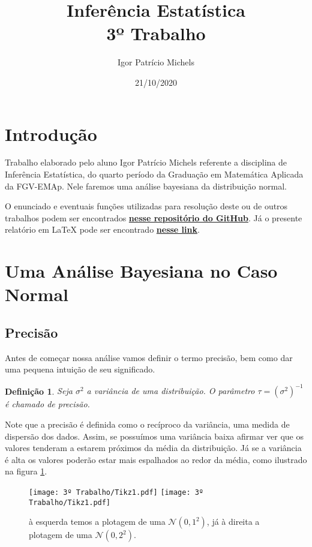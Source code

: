 \documentclass{article}
\title{Inferência Estatística \\ 3º Trabalho}
\author{Igor Patrício Michels}
\date{21/10/2020}
\newtheorem{definition}{Definição}
\begin{document}
\maketitle

\section*{Introdução}

Trabalho elaborado pelo aluno Igor Patrício Michels referente a disciplina de Inferência Estatística, do quarto período da Graduação em Matemática Aplicada da FGV-EMAp. Nele faremos uma análise bayesiana da distribuição normal.

O enunciado e eventuais funções utilizadas para resolução deste ou de outros trabalhos podem ser encontrados \href{https://github.com/IgorMichels/Statistical_Inference}{\textbf{nesse repositório do GitHub}}. Já o presente relatório em \LaTeX{} pode ser encontrado \href{https://www.overleaf.com/read/sdfnbcnthrms}{\textbf{nesse link}}.

\section*{Uma Análise Bayesiana no Caso Normal}

\subsection*{Precisão}

Antes de começar nossa análise vamos definir o termo precisão, bem como dar uma pequena intuição de seu significado.

\begin{definition}
    Seja $\sigma^2$ a variância de uma distribuição. O parâmetro $\tau = \left(\sigma^2\right)^{-1}$ é chamado de precisão.
\end{definition}

Note que a precisão é definida como o recíproco da variância, uma medida de dispersão dos dados. Assim, se possuímos uma variância baixa afirmar ver que os valores tenderam a estarem próximos da média da distribuição. Já se a variância é alta os valores poderão estar mais espalhados ao redor da média, como ilustrado na figura \ref{gaussianas}.
\begin{figure}[H]
    \texttt{[image: 3º Trabalho/Tikz1.pdf]}
    \texttt{[image: 3º Trabalho/Tikz1.pdf]}
    \caption{à esquerda temos a plotagem de uma $\mathcal{N}(0, 1^2)$, já à direita a plotagem de uma $\mathcal{N}(0, 2^2)$.}
    \label{gaussianas}
\end{figure}
\end{document}
